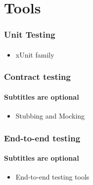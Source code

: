 \documentclass{beamer}
\begin{document}
\section{Tools}
\begin{frame}
	\frametitle{Unit Testing}
	\framesubtitle{}

	\begin{itemize}
 		 \item xUnit family 
	\end{itemize}
\end{frame}

\begin{frame}
	\frametitle{Contract testing}
	\framesubtitle{Subtitles are optional}

	\begin{itemize}
 		 \item Stubbing and Mocking
	\end{itemize}
\end{frame}

\begin{frame}
	\frametitle{End-to-end testing}
	\framesubtitle{Subtitles are optional}
	\begin{itemize}
 		 \item End-to-end testing tools
	\end{itemize}
\end{frame}




\end{document}
